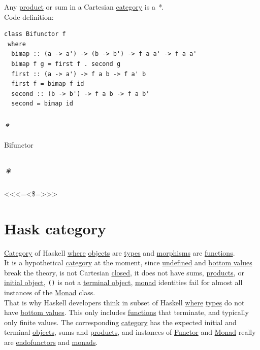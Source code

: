 \documentclass[a4paper,14pt,oneside]{book}
\begin{document}
{Any \hyperref[org3792151]{product} or sum in a Cartesian \hyperref[orgf2b19ad]{category} is a \emph{*}.\\

Code definition:\\
\begin{verbatim}
class Bifunctor f
 where
  bimap :: (a -> a') -> (b -> b') -> f a a' -> f a a'
  bimap f g = first f . second g
  first :: (a -> a') -> f a b -> f a' b
  first f = bimap f id
  second :: (b -> b') -> f a b -> f a b'
  second = bimap id
\end{verbatim}

\subsubsection{\emph{*}}
\label{sec:orga0a04ea}
\label{orgab8bdf0}Bifunctor\\

\subsection{\emph{*}}
\label{sec:org8a4c473}

<<<=<\$=>>>\\

\section{\label{orgfcbf91b}Hask category}
\label{sec:orgae4d942}
\hyperref[orgf2b19ad]{Category} of Haskell \hyperref[org5b6b021]{where} \hyperref[org7c09bf4]{objects} are \hyperref[org51532d9]{types} and \hyperref[org43d1069]{morphisms} are \hyperref[orgf33f5fb]{functions}.\\

It is a hypothetical \hyperref[orgf2b19ad]{category} at the moment, since \hyperref[org7cb8fc1]{undefined} and \hyperref[org2f5886e]{bottom values} break the theory, is not Cartesian \hyperref[orge092b92]{closed}, it does not have sums, \hyperref[org0d90b2d]{products}, or \hyperref[org82aae94]{initial object}, \texttt{()} is not a \hyperref[orgdb32ab4]{terminal object}, \hyperref[org90c21ab]{monad} identities fail for almost all instances of the \hyperref[org90c21ab]{Monad} class.\\

That is why Haskell developers think in subset of Haskell \hyperref[org5b6b021]{where} \hyperref[org51532d9]{types} do not have \hyperref[org2f5886e]{bottom values}. This only includes \hyperref[orgf33f5fb]{functions} that terminate, and typically only finite values. The corresponding \hyperref[orgf2b19ad]{category} has the expected initial and terminal \hyperref[org7c09bf4]{objects}, sums and \hyperref[org0d90b2d]{products}, and instances of \hyperref[orgba8e41d]{Functor} and \hyperref[org90c21ab]{Monad} really are \hyperref[org35404bb]{endofunctors} and \hyperref[org7e5e6f7]{monads}.\\

}
\end{document}
